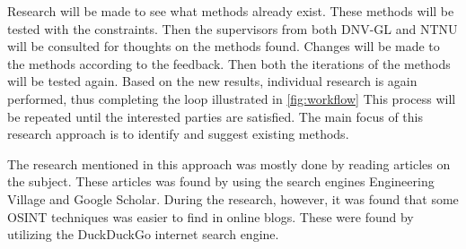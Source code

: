 Research will be made to see what methods already exist. These methods will be tested with the constraints. Then the supervisors from both DNV-GL and NTNU will be consulted for thoughts on the methods found. Changes will be made to the methods according to the feedback. Then both the iterations of the methods will be tested again. Based on the new results, individual research is again performed, thus completing the loop illustrated in \cref{fig:workflow} This process will be repeated until the interested parties are satisfied. 
The main focus of this research approach is to identify and suggest existing methods.

The research mentioned in this approach was mostly done by reading articles on the subject. These articles was found by using the search engines Engineering Village\cite{engineering_village} and Google Scholar\cite{google_scholar}. During the research, however, it was found that some OSINT techniques was easier to find in online blogs. These were found by utilizing the DuckDuckGo internet search engine\cite{ddg}. 


 

